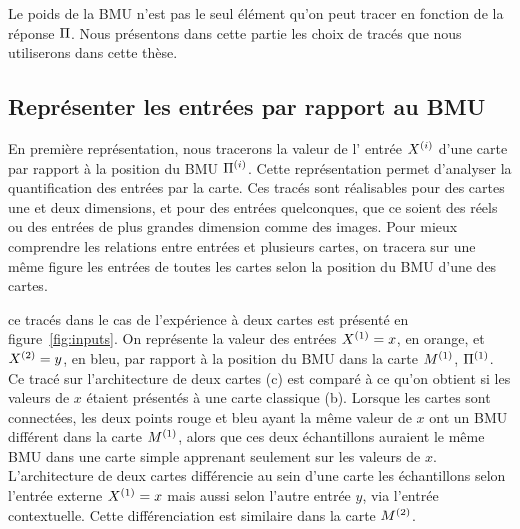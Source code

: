 Le poids de la BMU n'est pas le seul élément qu'on peut tracer en fonction de la réponse $\Pi$. Nous présentons dans cette partie les choix de tracés que nous utiliserons dans cette thèse.

\subsection{Représenter les entrées par rapport au BMU}

En première représentation, nous tracerons la valeur de l' entrée $X^{({i})}$ d'une carte par rapport à la position du BMU $\Pi^{({i})}$. Cette représentation permet d'analyser la quantification des entrées par la carte. Ces tracés sont réalisables pour des cartes une et deux dimensions, et pour des entrées quelconques, que ce soient des réels ou des entrées de plus grandes dimension comme des images.
Pour mieux comprendre les relations entre entrées et plusieurs cartes, on tracera sur une même figure les entrées de toutes les cartes selon la position du BMU d'une des cartes.

ce tracés dans le cas de l'expérience à deux cartes est présenté en figure~\ref{fig:inputs}. On représente la valeur des entrées $X^{({1})} = x$, en orange, et $X^{({2})}=y$, en bleu, par rapport à la position du BMU dans la carte $M^{({1})}$, $\Pi^{({1})}$. Ce tracé sur l'architecture de deux cartes (c) est comparé à ce qu'on obtient si les valeurs de $x$ étaient présentés à une carte classique (b). 
Lorsque les cartes sont connectées, les deux points rouge et bleu ayant la même valeur de $x$ ont un BMU différent dans la carte $M^{({1})}$, alors que ces deux échantillons auraient le même BMU dans une carte simple apprenant seulement sur les valeurs de $x$. L'architecture de deux cartes différencie au sein d'une carte les échantillons selon l'entrée externe $X^{({1})} = x$ mais aussi selon l'autre entrée $y$, via l'entrée contextuelle. Cette différenciation est similaire dans la carte $M^{({2})}$.

